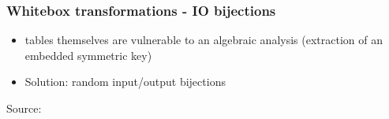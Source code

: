 \documentclass{beamer}
\begin{document}
\begin{frame}
    \frametitle{Whitebox transformations - IO bijections}
    \begin{itemize}
     \item tables themselves are vulnerable to an algebraic analysis (extraction of an embedded symmetric key)
     \item Solution: random input/output bijections
    \end{itemize}
    \centerline{}
    \centerline{\hbox{\tiny Source:}}
\end{frame}

\end{document}
